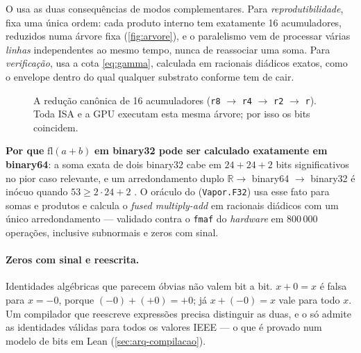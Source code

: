 O \vapor{} usa as duas consequências de modos complementares. Para \emph{reprodutibilidade}, fixa uma única ordem: cada produto interno tem exatamente 16 acumuladores, reduzidos numa árvore fixa (\autoref{fig:arvore}), e o paralelismo vem de processar várias \emph{linhas} independentes ao mesmo tempo, nunca de reassociar uma soma. Para \emph{verificação}, usa a cota \eqref{eq:gamma}, calculada em racionais diádicos exatos, como o envelope dentro do qual qualquer substrato conforme tem de cair.

\begin{figure}[htbp]
\centering
{}
\caption{A redução canônica de 16 acumuladores (\texttt{r8} $\to$ \texttt{r4} $\to$ \texttt{r2} $\to$ \texttt{r}). Toda ISA e a GPU executam esta mesma árvore; por isso os bits coincidem.}
\label{fig:arvore}
\end{figure}

\begin{mestrado}
\textbf{Por que} $\mathrm{fl}(a+b)$ \textbf{em binary32 pode ser calculado exatamente em binary64}: a soma exata de dois binary32 cabe em $24 + 24 + 2$ bits significativos no pior caso relevante, e um arredondamento duplo $\mathbb{R} \to$ binary64 $\to$ binary32 é inócuo quando $53 \geq 2 \cdot 24 + 2$ \cite{higham2002}. O oráculo do \vapor{} (\texttt{Vapor.F32}) usa esse fato para somas e produtos e calcula o \textit{fused multiply-add} em racionais diádicos com um único arredondamento --- validado contra o \texttt{fmaf} do \textit{hardware} em 800\,000 operações, inclusive subnormais e zeros com sinal.
\end{mestrado}

\paragraph{Zeros com sinal e reescrita.} Identidades algébricas que parecem óbvias não valem bit a bit. $x + 0 = x$ é falsa para $x = -0$, porque $(-0) + (+0) = +0$; já $x + (-0) = x$ vale para todo $x$. Um compilador que reescreve expressões precisa distinguir as duas, e o \vapor{} só admite as identidades válidas para todos os valores IEEE --- o que é provado num modelo de bits em Lean (\autoref{sec:arq-compilacao}).

